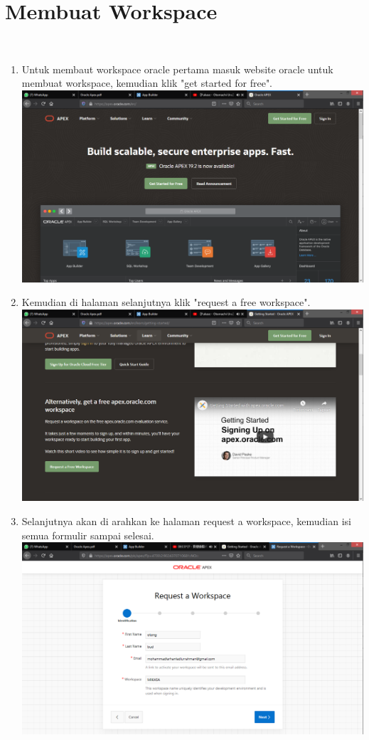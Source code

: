 \documentclass[12pt]{article}
\begin{document}
\section*{Membuat Workspace}\
	\begin{enumerate}
		\item Untuk membaut workspace oracle pertama masuk website oracle untuk membuat workspace, kemudian klik "get started for free".\\
		\includegraphics[scale=0.3]{src/1}
		\item Kemudian di halaman selanjutnya klik "request a free workspace".\\
		\includegraphics[scale=0.3]{src/2}
		\item Selanjutnya akan di arahkan ke halaman request a workspace, kemudian isi semua formulir sampai selesai.\\
		\includegraphics[scale=0.3]{src/3}

\end{enumerate}
\end{document}
